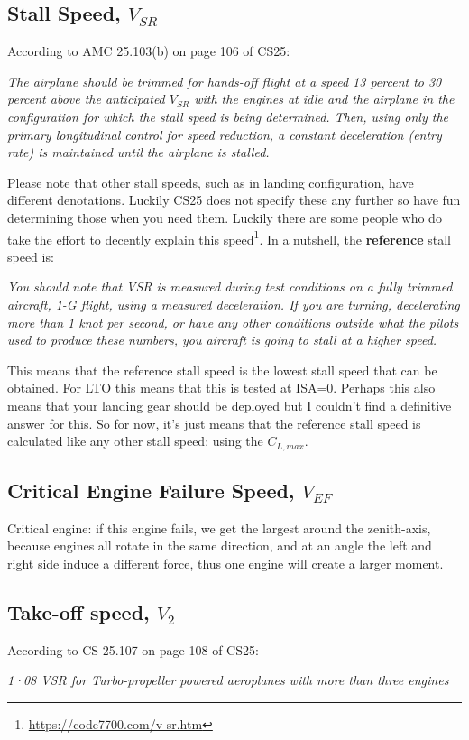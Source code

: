 \subsection{Stall Speed, $V_{SR}$}
According to AMC 25.103(b) on page 106 of CS25:
\begin{center}
    \textit{The airplane should be trimmed for hands-off flight at a speed 13 percent to 30 percent above the anticipated $V_{SR}$ with the engines at idle and the airplane in the configuration for which the stall speed is being determined. Then, using only the primary longitudinal control for speed reduction, a constant deceleration (entry rate) is maintained until the airplane is stalled.}
\end{center}
Please note that other stall speeds, such as in landing configuration, have different denotations. Luckily CS25 does not specify these any further so have fun determining those when you need them. Luckily there are some people who do take the effort to decently explain this speed\footnote{\url{https://code7700.com/v-sr.htm}}. In a nutshell, the \textbf{reference} stall speed is:
\begin{center}
    \textit{You should note that VSR is measured during test conditions on a fully trimmed aircraft, 1-G flight, using a measured deceleration. If you are turning, decelerating more than 1 knot per second, or have any other conditions outside what the pilots used to produce these numbers, you aircraft is going to stall at a higher speed.}
\end{center}
This means that the reference stall speed is the lowest stall speed that can be obtained. For LTO this means that this is tested at ISA=0. Perhaps this also means that your landing gear should be deployed but I couldn't find a definitive answer for this. So for now, it's just means that the reference stall speed is calculated like any other stall speed: using the $C_{L,max}$. 

\subsection{Critical Engine Failure Speed, $V_{EF}$}
Critical engine: if this engine fails, we get the largest around the zenith-axis, because engines all rotate in the same direction, and at an angle the left and right side induce a different force, thus one engine will create a larger moment.

\subsection{Take-off speed, $V_2$}
According to CS 25.107 on page 108 of CS25:
\begin{center}
    \textit{1·08 VSR for Turbo-propeller powered aeroplanes with more than three engines}
\end{center}

